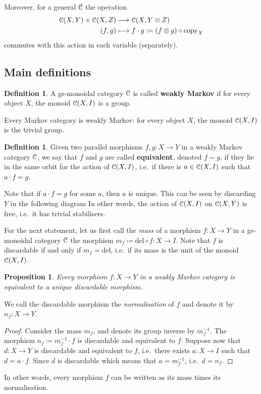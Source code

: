\documentclass[a4paper,UKenglish,numberwithinsect,cleveref, autoref, thm-restate]{lipics-v2021}
\theoremstyle{plain} %
\newtheorem{myproposition}[mytheorem]{Proposition}
\theoremstyle{definition} %
\newtheorem{mydefinition}[mytheorem]{Definition}
\begin{document}
Moreover, for a general $\mathcal{C}$ the operation
\begin{align*}
	\mathcal{C}(X,Y) \times \mathcal{C}(X,Z) & \longrightarrow \mathcal{C}(X,Y \otimes Z)		\\
	(f,g) & \longmapsto f\cdot g \coloneqq (f\otimes g)\circ\mathrm{copy}_X
\end{align*}
commutes with this action in each variable (separately). 

\subsection{Main definitions}


\begin{mydefinition}\label{defweaklymarkov}
 A gs-monoidal category $\mathcal{C}$ is called \textbf{weakly Markov} if for every object $X$, the monoid $\mathcal{C}(X,I)$ is a group. 
\end{mydefinition}

Every Markov category is weakly Markov: for every object $X$, the monoid $\mathcal{C}(X,I)$ is the trivial group.

\begin{mydefinition}
 Given two parallel morphisms $f,g:X\to Y$ in a weakly Markov category $\mathcal{C}$, we say that $f$ and $g$ are called \textbf{equivalent}, denoted $f\sim g$, if they lie in the same orbit for the action of $\mathcal{C}(X,I)$, i.e.~if there is $a\in \mathcal{C}(X,I)$ such that $a\cdot f=g$.
\end{mydefinition}

Note that if $a\cdot f=g$ for some $a$, then $a$ is unique. This can be seen by discarding $Y$ in the following diagram
In other words, the action of $\mathcal{C}(X,I)$ on $\mathcal{C}(X,Y)$ is free, i.e.~it has trivial stabilisers.

For the next statement, let us first call the \emph{mass} of a morphism $f:X\to Y$ in a gs-monoidal category $\mathcal{C}$ the morphism $m_f\coloneqq \mathrm{del}\circ f:X\to I$.
Note that $f$ is discardable if and only if $m_f=\mathrm{del}$, i.e.~if its mass is the unit of the monoid $\mathcal{C}(X,I)$.

\begin{myproposition}\label{weaklydiscardable}
 Every morphism $f:X\to Y$ in a weakly Markov category is equivalent to a unique discardable morphism.
\end{myproposition}
We call the discardable morphism the \emph{normalisation} of $f$ and denote it by $n_f:X\to Y$.
\begin{proof}
 Consider the mass $m_f$, and denote its group inverse by $m_f^{-1}$. The morphism $n_f\coloneqq m_f^{-1}\cdot f$ is discardable and equivalent to $f$.
 Suppose now that $d:X\to Y$ is discardable and equivalent to $f$, i.e.~there exists $a:X\to I$ such that $d = a\cdot f$. 
 Since $d$ is discardable
 which means that $a=m_f^{-1}$, i.e.~$d=n_f$. 
\end{proof}
In other words, every morphism $f$ can be written as its mass times its normalisation. 
\end{document}
